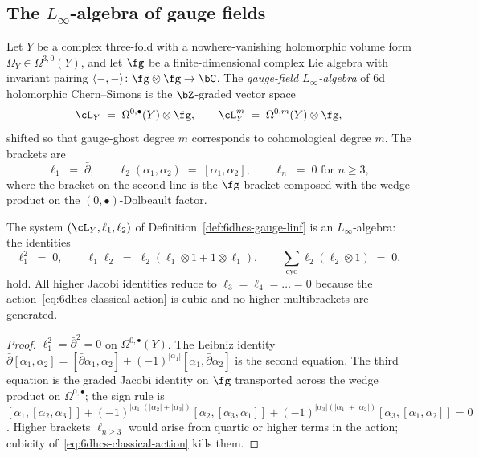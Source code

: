 \subsection{The $L_\infty$-algebra of gauge fields}
\label{subsec:vol2-bvbrst-6dhcs-linf}

\begin{definition}
\label{def:6dhcs-gauge-linf}
Let $Y$ be a complex three-fold with a nowhere-vanishing holomorphic
volume form $\Omega_Y\in\Omega^{3,0}(Y)$, and let $\fg$ be a
finite-dimensional complex Lie algebra with invariant pairing
$\langle-,-\rangle\colon\fg\otimes\fg\to\bC$. The \emph{gauge-field
$L_\infty$-algebra} of 6d holomorphic Chern--Simons is the
$\bZ$-graded vector space
\begin{equation}\label{eq:6dhcs-gauge-linf-space}
 \cL_Y \;=\; \Omega^{0,\bullet}(Y)\otimes\fg,
 \qquad
 \cL_Y^m \;=\; \Omega^{0,m}(Y)\otimes\fg,
\end{equation}
shifted so that gauge-ghost degree $m$ corresponds to cohomological
degree $m$. The brackets are
\begin{equation}\label{eq:6dhcs-gauge-linf-brackets}
 \ell_1 \;=\; \bar\partial,
 \qquad
 \ell_2(\alpha_1,\alpha_2) \;=\; [\alpha_1,\alpha_2],
 \qquad
 \ell_n \;=\; 0 \text{ for } n\geq 3,
\end{equation}
where the bracket on the second line is the $\fg$-bracket composed
with the wedge product on the $(0,\bullet)$-Dolbeault factor.
\end{definition}

\begin{proposition}
\label{prop:6dhcs-linf-relations}
The system $(\cL_Y,\ell_1,\ell_2)$ of
Definition~\ref{def:6dhcs-gauge-linf} is an $L_\infty$-algebra: the
identities
\begin{equation}\label{eq:6dhcs-linf-relations}
 \ell_1^2 \;=\; 0,
 \qquad
 \ell_1\ell_2 \;=\; \ell_2(\ell_1\otimes 1 + 1\otimes\ell_1),
 \qquad
 \sum_{\mathrm{cyc}} \ell_2(\ell_2\otimes 1) \;=\; 0,
\end{equation}
hold. All higher Jacobi identities reduce to
$\ell_3 = \ell_4 = \ldots = 0$ because the
action~\eqref{eq:6dhcs-classical-action}
is cubic and no higher multibrackets are generated.
\end{proposition}

\begin{proof}
$\ell_1^2 = \bar\partial^2 = 0$ on $\Omega^{0,\bullet}(Y)$. The
Leibniz identity $\bar\partial[\alpha_1,\alpha_2] =
[\bar\partial\alpha_1,\alpha_2] + (-1)^{|\alpha_1|}[\alpha_1,\bar\partial
\alpha_2]$ is the second equation. The third equation is the graded
Jacobi identity on $\fg$ transported across the wedge product on
$\Omega^{0,\bullet}$; the sign rule is
$[\alpha_1,[\alpha_2,\alpha_3]] + (-1)^{|\alpha_1|(|\alpha_2|+|\alpha_3|)}
[\alpha_2,[\alpha_3,\alpha_1]] +
(-1)^{|\alpha_3|(|\alpha_1|+|\alpha_2|)}[\alpha_3,[\alpha_1,\alpha_2]] = 0$.
Higher brackets $\ell_{n\geq 3}$ would arise from quartic or higher
terms in the action; cubicity of~\eqref{eq:6dhcs-classical-action} kills them.
\end{proof}

